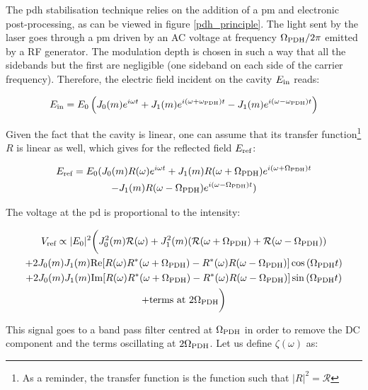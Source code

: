 The \gls{pdh} stabilisation technique relies on the addition of a \gls{pm} and electronic post-processing, as can be viewed in figure \ref{pdh_principle}. The light sent by the laser goes through a \gls{pm} driven by an AC voltage at frequency $\Omega_{\text{PDH}}/2\pi$ emitted by a RF generator. The modulation depth is chosen in such a way that all the sidebands but the first are negligible (one sideband on each side of the carrier frequency). Therefore, the electric field incident on the cavity $E_{\text{in}}$ reads:

\begin{equation}
	E_{\text{in}} = E_0 \left(J_0(m) e^{i\omega t} + J_1(m)e^{i(\omega +\omega_{\text{PDH}})t} - J_1(m)e^{i(\omega -\omega_{\text{PDH}})t}  \right)
\end{equation}

Given the fact that the cavity is linear, one can assume that its transfer function\footnote{As a reminder, the transfer function is the function such that $|R|^2=\mathcal{R}$} $R$ is linear as well, which gives for the reflected field $E_{\text{ref}}$:

\begin{gather}
	E_{\text{ref}} = E_0 ( J_0(m) R(\omega) e^{i \omega t} + J_1(m) R(\omega+\Omega_{\text{PDH}}) e^{i (\omega+\Omega_{\text{PDH}}) t} \nonumber \\
	- J_1(m) R(\omega-\Omega_{\text{PDH}}) e^{i (\omega-\Omega_{\text{PDH}}) t} )
\end{gather}

The voltage at the \gls{pd} is proportional to the intensity:

\begin{gather}
	V_{\text{ref}} \propto |E_0|^2 \bigg( J_0^2(m) \mathcal{R}(\omega) + J_1^2(m) (\mathcal{R}(\omega+\Omega_{\text{PDH}}) + \mathcal{R}(\omega-\Omega_{\text{PDH}})) \nonumber \\
	+ 2 J_0(m)J_1(m) \text{Re}[R(\omega)R^*(\omega+\Omega_{\text{PDH}})-R^*(\omega)R(\omega-\Omega_{\text{PDH}})] \cos{(\Omega_{\text{PDH}} t)} \nonumber \\
	+ 2 J_0(m)J_1(m) \text{Im}[R(\omega)R^*(\omega+\Omega_{\text{PDH}})-R^*(\omega)R(\omega-\Omega_{\text{PDH}})] \sin{(\Omega_{\text{PDH}} t)} \nonumber \\
	+ \text{terms at } 2\Omega_{\text{PDH}} \bigg)
\end{gather}

This signal goes to a band pass filter centred at $\Omega_{\text{PDH}}$ in order to remove the DC component and the terms oscillating at $2\Omega_{\text{PDH}}$. Let us define $\zeta(\omega)$ as:

